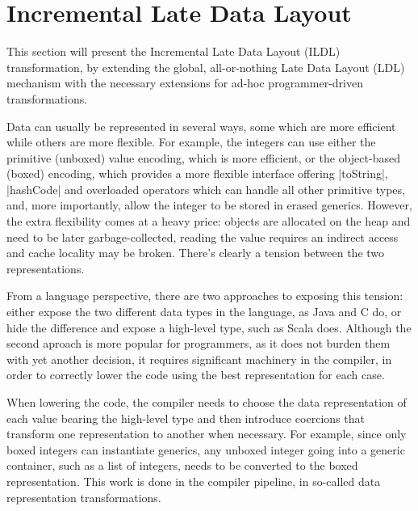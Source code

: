 \section{Incremental Late Data Layout}
\label{sec:ildl}

This section will present the Incremental Late Data Layout (ILDL) transformation, by extending the global, all-or-nothing Late Data Layout (LDL) mechanism with the necessary extensions for ad-hoc programmer-driven transformations.


Data can usually be represented in several ways, some which are more efficient while others are more flexible. For example, the integers can use either the primitive (unboxed) value encoding, which is more efficient, or the object-based (boxed) encoding, which provides a more flexible interface offering |toString|, |hashCode| and overloaded operators which can handle all other primitive types, and, more importantly, allow the integer to be stored in erased generics. However, the extra flexibility comes at a heavy price: objects are allocated on the heap and need to be later garbage-collected, reading the value requires an indirect access and cache locality may be broken. There's clearly a tension between the two representations.

From a language perspective, there are two approaches to exposing this tension: either expose the two different data types in the language, as Java and C do, or hide the difference and expose a high-level type, such as Scala does. Although the second aproach is more popular for programmers, as it does not burden them with yet another decision, it requires significant machinery in the compiler, in order to correctly lower the code using the best representation for each case.

When lowering the code, the compiler needs to choose the data representation of each value bearing the high-level type and then introduce coercions that transform one representation to another when necessary. For example, since only boxed integers can instantiate generics, any unboxed integer going into a generic container, such as a list of integers, needs to be converted to the boxed representation. This work is done in the compiler pipeline, in so-called data representation transformations.

